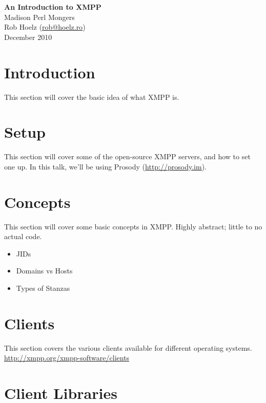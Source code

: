 \documentclass{article}
\begin{document}
\begin{titlepage}
\vspace*{\fill}
\begin{center}
{\huge \bfseries An Introduction to XMPP} \\[0.5cm]
{\LARGE Madison Perl Mongers} \\[0.5cm]
{\large Rob Hoelz (\href{mailto:rob@hoelz.ro}{rob@hoelz.ro})} \\[0.5cm]
{\large December 2010}
\end{center}
\vspace*{\fill}
\end{titlepage}

\newpage
\part{Introduction}

\newpage
This section will cover the basic idea of what XMPP is.

\newpage
\part{Setup}

\newpage
This section will cover some of the open-source XMPP servers, and
how to set one up.  In this talk, we'll be using Prosody (\url{http://prosody.im}).

\newpage
\part{Concepts}

\newpage
This section will cover some basic concepts in XMPP.  Highly abstract; little to no
actual code.

\begin{itemize}
\item JIDs
\item Domains vs Hosts
\item Types of Stanzas
\end{itemize}

\newpage
\part{Clients}

\newpage
This section covers the various clients available for different operating systems.
\url{http://xmpp.org/xmpp-software/clients}

\newpage
\part{Client Libraries}
\end{document}
